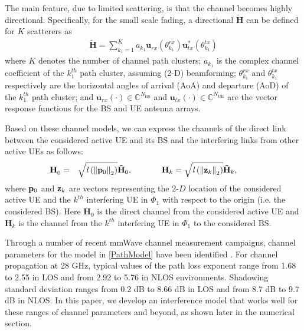 \documentclass[12pt, draftclsnofoot, onecolumn]{IEEEtran}
\theoremstyle{plain}
\begin{document}
The main feature, due to limited scattering, is that the channel becomes highly directional. Specifically, for the small scale fading, a directional $\mathbf{\tilde{H}}$ can be defined for $K$ scatterers %
as \vspace{-.08in}
%
\begin{eqnarray}\label{Full_model_ch}
\mathbf{\tilde{H}} = \sum_{k_1=1}^K a_{k_1} \mathbf{u}_{rx} \left( \theta_{k_1}^{rx} \right)   \mathbf{u}_{tx}^{\ast} \left( \theta_{k_1}^{tx} \right)
\end{eqnarray}
where $K$ denotes the number of channel path clusters; $a_{k_1}$ is the complex channel coefficient of the $k_1^{th}$ path cluster, assuming (2-D) beamforming; $ \theta_{k_1}^{rx}$ and $ \theta_{k_1}^{tx}$ respectively are the horizontal angles of arrival (AoA) and departure (AoD) of the $k_1^{th}$ path cluster; and $\mathbf{u}_{rx}(\cdot) \in \mathbb{C}^{N_{\text{BS}}}$ and $\mathbf{u}_{tx}\left(\cdot\right) \in \mathbb{C}^{N_{\text{UE}}}$ are the vector response functions for the BS and UE antenna arrays.

Based on {these} channel models, we can express the channels of the direct link between the considered active UE and its BS and the interfering links from other active UEs as follows: \vspace{-.08in}
\begin{eqnarray}
\!\!\!\!\!\!\!\!\!\!\!\!\!\!{\mathbf{H}_{0}^{}}&=&{} \sqrt{\mathit{l}\left({\Vert \bold{p}_0 \Vert}_2\right)}\mathbf{\tilde{H}}_{0},\quad \quad \quad \;\;
%
%
{\mathbf{H}_{k}}={} \sqrt{\mathit{l}\left({\Vert \bold{z}_k \Vert}_2\right)}\mathbf{\tilde{H}}_{k},
\label{eq2} 
\end{eqnarray}
\!\!\!\! where $ \bold{p}_0 $ and $ \bold{z}_k $ are vectors representing the 2-$ D $ location of the considered active UE and the $k^{th}$ interfering UE in $ \Phi_1 $ with respect to the origin (i.e. the considered BS). Here $ \mathbf{H}_{0} $ is the direct channel from the considered active UE and $ \mathbf{H}_{k} $ is the channel from the $ k^{th} $ interfering UE in $ \Phi_1 $ to the considered BS. 


Through a number of recent mmWave channel measurement campaigns, channel parameters for the model in \eqref{PathModel} have been identified \cite{mmWave2,mmWave4,mmWave6515173,mmWave6387266}. For channel propagation at 28 GHz, typical values of the path loss exponent range from 1.68 to 2.55 in {LOS} and from 2.92 %
to 5.76 in {NLOS} environments. {Shadowing} standard deviation ranges from 0.2 dB to 8.66 dB in {LOS} and from 8.7 dB to 9.7 dB %
in {NLOS}. In this paper, we develop {an interference} model that works well for these ranges of channel parameters and beyond, as shown later in the numerical section.
\end{document}
